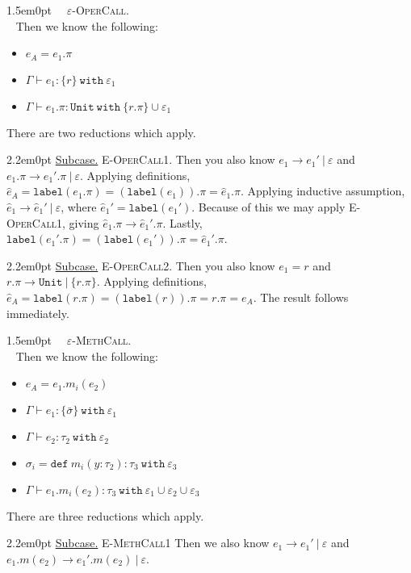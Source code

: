 \documentclass{llncs}
\newcommand{\keywadj}[1]{\mathtt{#1}}
\newcommand{\keyw}[1]{\keywadj{#1}~}
\newcommand{\proofcase}[2]{
	\begin{adjustwidth}{1.5em}{0pt}
		\fbox{Case.}~~#1. \\ ~#2
	\end{adjustwidth}
}
\newcommand{\subcase}[1] {
	\begin{adjustwidth}{2.2em}{0pt}
		\underline{Subcase.} #1
	\end{adjustwidth}
}
\newcommand{\type}[2]{
	#1~\keyw{with} #2
}
\begin{document}
{{{}


}
	
	

\proofcase{\textsc{$\varepsilon$-OperCall}}{
	Then we know the following:
	\begin{itemize}
		\item $e_A = e_1.\pi$
		\item $\Gamma \vdash e_1 : \type{\{ r \}}{\varepsilon_1}$
		\item $\Gamma \vdash e_1.\pi : \type{\keywadj{Unit}}{\{ r.\pi \} \cup \varepsilon_1}$
	\end{itemize}
\noindent
There are two reductions which apply. \\

	\subcase{ \textsc{E-OperCall1.} Then you also know $e_1 \longrightarrow e_1'~|~\varepsilon$ and $e_1.\pi \longrightarrow e_1'.\pi~|~\varepsilon$. Applying definitions, $\hat e_A = \keywadj{label}(e_1.\pi) = (\keywadj{label}(e_1)).\pi = \hat e_1.\pi$. Applying inductive assumption, $\hat e_1 \longrightarrow \hat e_1'~|~\varepsilon$, where $\hat e_1' = \keywadj{label}(e_1')$. Because of this we may apply \textsc{E-OperCall1}, giving $\hat e_1.\pi \longrightarrow \hat e_1'.\pi$. Lastly, $\keywadj{label}(e_1'.\pi) = (\keywadj{label}(e_1')).\pi = \hat e_1'.\pi$. \\
	}
	
	\subcase{ \textsc{E-OperCall2.} Then you also know $e_1 = r$ and $r.\pi \longrightarrow \keywadj{Unit}~|~\{ r.\pi \}$. Applying definitions, $\hat e_A = \keywadj{label}(r.\pi) = (\keywadj{label}(r)).\pi = r.\pi = e_A$. The result follows immediately.\\
	}

}





\proofcase{\textsc{$\varepsilon$-MethCall}}{
	Then we know the following:
	\begin{itemize}
		\item $e_A = e_1.m_i(e_2)$
		\item $\Gamma \vdash e_1 : \type{\{ \bar \sigma \}}{\varepsilon_1}$
		\item $\Gamma \vdash e_2 : \type{\tau_2}{\varepsilon_2}$
		\item $\sigma_i = \keywadj{def}~m_i(y : \tau_2) : \type{\tau_3}{\varepsilon_3}$
		\item $\Gamma \vdash e_1.m_i(e_2) : \type{\tau_3}{\varepsilon_1 \cup \varepsilon_2 \cup \varepsilon_3}$
	\end{itemize}
\noindent
There are three reductions which apply. \\

\subcase{ \textsc{E-MethCall1} Then we also know $e_1 \longrightarrow e_1'~|~\varepsilon$ and $e_1.m(e_2) \longrightarrow e_1'.m(e_2)~|~\varepsilon$.
}

}
}
\end{document}
